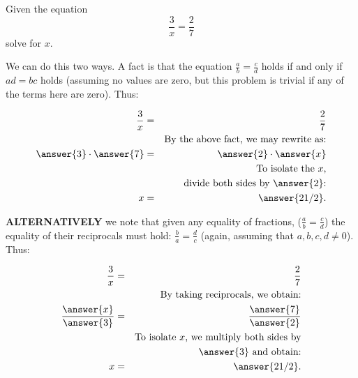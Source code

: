 \documentclass{ximera}
\begin{document}
\begin{question}
Given the equation $$\frac{3}{x}=\frac{2}{7}$$ solve for $x$.

We can do this two ways.  A fact is that the equation $\frac{a}{b}=\frac{c}{d}$ holds if and only if $ad=bc$ holds (assuming no values are zero, but this problem is trivial if any of the terms here are zero).  Thus:

\begin{eqnarray*}
\frac{3}{x}&=& \frac{2}{7}\\
&&\text{By the above fact, we may rewrite as:}\\
\answer{3}\cdot\answer{7}&=& \answer{2}\cdot\answer{x}\\
&&\text{To isolate the $x$,}\\
&&\text{ divide both sides by $\answer{2}$:}\\
x&=& \answer{21/2}.
\end{eqnarray*}

\textbf{ALTERNATIVELY} we note that given any equality of fractions, ($\frac{a}{b}=\frac{c}{d}$) the equality of their reciprocals must hold: $\frac{b}{a}=\frac{d}{c}$ (again, assuming that $a,b,c,d\neq0$).  Thus:

\begin{eqnarray*}
\frac{3}{x}&=& \frac{2}{7}\\
&&\text{By taking reciprocals, we obtain:}\\
\frac{\answer{x}}{\answer{3}}&=& \frac{\answer{7}}{\answer{2}}\\
&&\text{To isolate $x$, we multiply both sides by} \\
&&\text{$\answer{3}$ and obtain:}\\
x&=& \answer{21/2}.
\end{eqnarray*}


\end{question}
\end{document}
